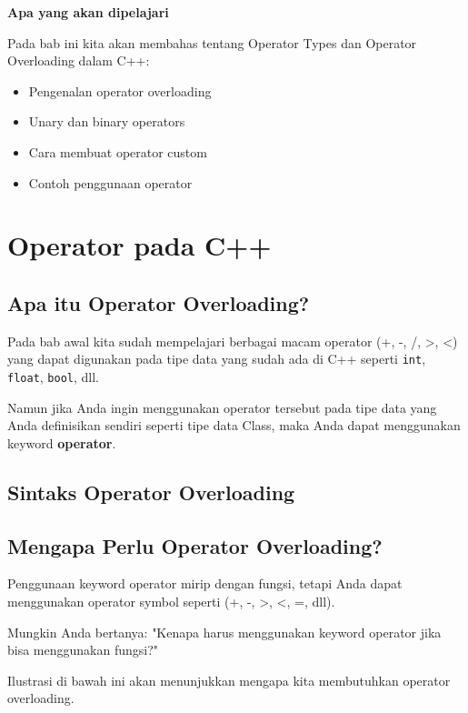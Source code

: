 \textbf{Apa yang akan dipelajari}

Pada bab ini kita akan membahas tentang Operator Types dan Operator Overloading dalam C++:

\begin{itemize}
\item Pengenalan operator overloading
\item Unary dan binary operators
\item Cara membuat operator custom
\item Contoh penggunaan operator
\end{itemize}

\minitoc

\section{Operator pada C++}\label{operator-pada-cpp}

\subsection{Apa itu Operator Overloading?}

Pada bab awal kita sudah mempelajari berbagai macam operator (+, -, /, >, <) yang dapat digunakan pada tipe data yang sudah ada di C++ seperti \texttt{int}, \texttt{float}, \texttt{bool}, dll.

Namun jika Anda ingin menggunakan operator tersebut pada tipe data yang Anda definisikan sendiri seperti tipe data Class, maka Anda dapat menggunakan keyword \textbf{operator}.

\subsection{Sintaks Operator Overloading}



\subsection{Mengapa Perlu Operator Overloading?}

Penggunaan keyword operator mirip dengan fungsi, tetapi Anda dapat menggunakan operator symbol seperti (+, -, >, <, =, dll).

Mungkin Anda bertanya: "Kenapa harus menggunakan keyword operator jika bisa menggunakan fungsi?"

Ilustrasi di bawah ini akan menunjukkan mengapa kita membutuhkan operator overloading.

